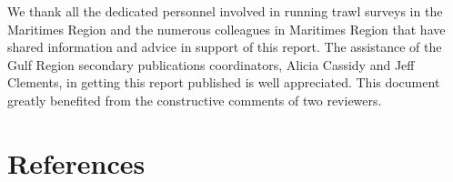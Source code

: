 \documentclass[12pt]{article}\usepackage[]{graphicx}\usepackage[]{color}
\begin{document}
We thank all the dedicated personnel involved in running trawl surveys in the Maritimes Region and the numerous colleagues in Maritimes Region that have shared information and advice in support of this report. The assistance of the Gulf Region secondary publications coordinators, Alicia Cassidy and Jeff Clements, in getting this report published is well appreciated. This document greatly benefited from the constructive comments of two reviewers.

\clearpage

\hypertarget{references}{%
\section{References}\label{references}}

\noindent \vspace{-2em} \setlength{\parindent}{-0.2in} \setlength{\leftskip}{0.2in} \setlength{\parskip}{8pt}
\end{document}
